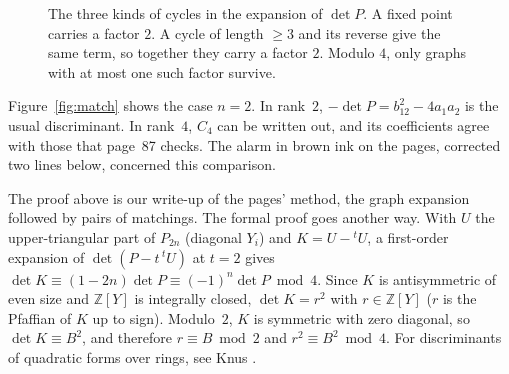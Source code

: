\documentclass[11pt,a4paper]{amsart}
\theoremstyle{definition}
\theoremstyle{remark}
\newcommand{\Z}{\mathbb Z}
\begin{document}
\begin{figure}[ht]
\centering
{}
\caption{The three kinds of cycles in the expansion of $\det P$. A fixed point carries a factor $2$. A cycle of length $\ge 3$ and its reverse give the same term, so together they carry a factor $2$. Modulo $4$, only graphs with at most one such factor survive.}\label{fig:graphs}
\end{figure}

Figure~\ref{fig:match} shows the case $n = 2$. In rank~$2$, $-\det P = b_{12}^2 - 4a_1a_2$ is the usual discriminant. In rank~$4$, $C_4$ can be written out, and its coefficients agree with those that page~87 checks. The alarm in brown ink on the pages, corrected two lines below, concerned this comparison.

The proof above is our write-up of the pages' method, the graph expansion followed by pairs of matchings. The formal proof goes another way. With $U$ the upper-triangular part of $P_{2n}$ (diagonal $Y_i$) and $K = U - {}^tU$, a first-order expansion of $\det(P - t\,{}^tU)$ at $t = 2$ gives $\det K \equiv (1 - 2n)\det P \equiv (-1)^n\det P \bmod 4$. Since $K$ is antisymmetric of even size and $\Z[Y]$ is integrally closed, $\det K = r^2$ with $r \in \Z[Y]$ ($r$ is the Pfaffian of $K$ up to sign). Modulo~$2$, $K$ is symmetric with zero diagonal, so $\det K \equiv B^2$, and therefore $r \equiv B \bmod 2$ and $r^2 \equiv B^2 \bmod 4$. For discriminants of quadratic forms over rings, see Knus \cite{knus1991}.
\end{document}

